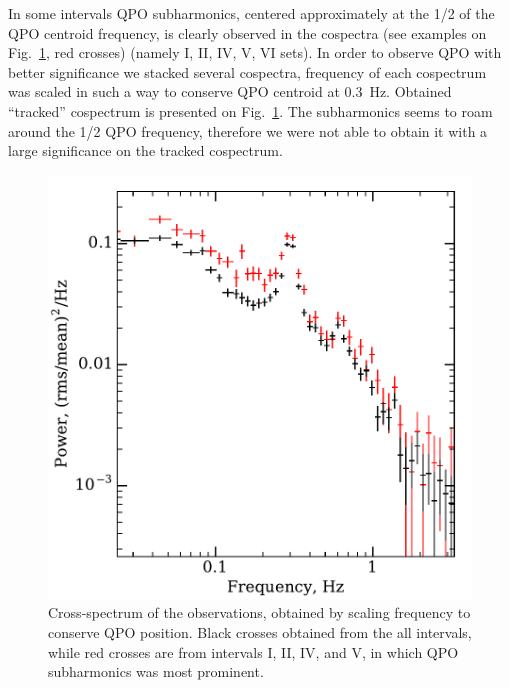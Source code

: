 \documentclass[a4paper,fleqn,usenatbib]{mnras}
\begin{document}
In some intervals QPO subharmonics, centered approximately at the 1/2 of the QPO centroid frequency, is clearly observed in the cospectra (see examples on Fig.~\ref{fig:cospec_tracked}, red crosses) (namely I, II, IV, V, VI sets).
In order to observe QPO with better significance we stacked several cospectra, frequency of each cospectrum was scaled in such a way to conserve QPO centroid at 0.3~Hz.
Obtained ``tracked'' cospectrum is presented on Fig.~\ref{fig:cospec_tracked}.
The subharmonics seems to roam around the 1/2 QPO frequency, therefore we were not able to obtain it with a large significance on the tracked cospectrum.


\begin{figure}
        \includegraphics[width=\columnwidth]{folded_cospectr2.pdf}
        \caption{Cross-spectrum of the observations, obtained by scaling frequency to conserve QPO position.
        Black crosses obtained from the all intervals, while red crosses are from intervals I, II, IV, and V, in which QPO subharmonics was most prominent.}
        \label{fig:cospec_tracked}
\end{figure}
\end{document}
